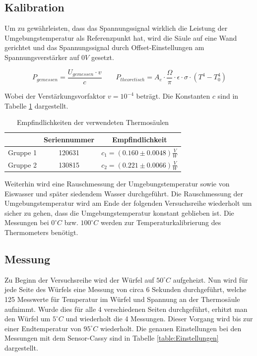 \documentclass[a4paper, 11pt]{article}
\begin{document}
\subsection{Kalibration}
Um zu gewährleisten, dass das Spannungssignal wirklich die Leistung der Umgebungstemperatur als Referenzpunkt hat, wird die Säule auf eine Wand gerichtet und das Spannungssignal durch Offset-Einstellungen am Spannungsverstärker auf $0V$ gesetzt.

\begin{equation}
P_{gemessen}=\frac{U_{gemessen} \cdot v}{c}
\qquad
P_{theoretisch}=A_e \cdot \frac{\Omega}{\pi} \cdot \epsilon \cdot \sigma \cdot (T^4-T_0^4)
\end{equation}

Wobei der Verstärkungsvorfaktor $v=10^{-4}$ beträgt. Die Konstanten $c$ sind in Tabelle \ref{table:Empfindlichkeiten} dargestellt.

\begin{table}[h]
\centering
	\begin{tabular}{|c|c|c|}
	\hline          & Seriennummer & Empfindlichkeit \\
	\hline Gruppe 1 & 120631 &$c_1=(0.160 \pm   0.0048)\frac{V}{W} $ \\
	\hline Gruppe 2 & 130815  &$c_2=(0.221 \pm   0.0066)\frac{V}{W} $     \\
	\hline
	\end{tabular}
\caption{Empfindlichkeiten der verwendeten Thermosäulen}
\label{table:Empfindlichkeiten}
\end{table}

Weiterhin wird eine Rauschmessung der Umgebungstemperatur sowie von Eiswasser und später siedendem Wasser durchgeführt. Die Rauschmessung der Umgebungstemperatur wird am Ende der folgenden Versuchsreihe wiederholt um sicher zu gehen, dass die Umgebungstemperatur konstant geblieben ist.
Die Messungen bei $0^\circ C$ bzw. $100^\circ C$ werden zur Temperaturkalibrierung des Thermometers benötigt.

\subsection{Messung}
Zu Beginn der Versuchsreihe wird der Würfel auf $50^\circ C$ aufgeheizt. Nun wird für jede Seite des Würfels eine Messung von circa 6 Sekunden durchgeführt, welche 125 Messwerte für Temperatur im Würfel und Spannung an der Thermosäule aufnimmt.
Wurde dies für alle 4 verschiedenen Seiten durchgeführt, erhitzt man den Würfel um $5^\circ C$ und wiederholt die 4 Messungen. Dieser Vorgang wird bis zur einer Endtemperatur von $95^\circ C$ wiederholt.
Die genauen Einstellungen bei den Messungen mit dem Sensor-Cassy sind in Tabelle \ref{table:Einstellungen} dargestellt.
 
\end{document}
